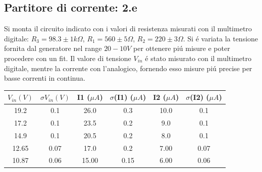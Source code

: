 \documentclass[10pt,a4paper]{article}
\begin{document}
\subsection{Partitore di corrente: 2.e}

Si monta il circuito indicato con i valori di resistenza misurati con il multimetro digitale: 
$R_3= 98.3\pm 1 k\Omega$, $R_1 = 560\pm 5 \Omega$, $R_2 = 220\pm 3 \Omega$.
Si \'e variata la tensione fornita dal generatore nel range $20-10 V$ per ottenere pi\'u misure e poter procedere con un fit.
Il valore di tensione $V_{in}$ \'e stato misurato con il multimetro digitale, mentre la corrente con l'analogico, fornendo esso misure pi\'u precise per basse correnti in continua.\\
 

\begin{center}
\begin{tabular}{|c|c|c|c|c|c|}
\hline 
$V_{in} (V)$ & $\sigma V_{in} (V)$& I1 ($\mu A$)& $\sigma$(I1) ($\mu A$) & I2	($\mu A$) & $\sigma$(I2) ($\mu A$)  \\
\hline 
19.2 & 0.1 & 26.0 & 0.3 & 10.0 & 0.1 \\
17.2 & 0.1 & 23.5 & 0.2 & 9.0 & 0.1 \\
14.9 & 0.1 & 20.5 & 0.2 & 8.0 & 0.1 \\
12.65 & 0.07 & 17.0 & 0.2 & 7.00 & 0.07 \\
10.87 & 0.06 & 15.00 & 0.15 & 6.00 & 0.06 \\
\hline 
\end{tabular} 
\end{center}
\end{document}
